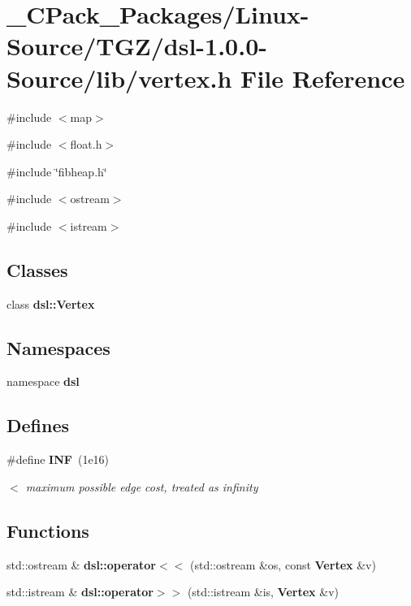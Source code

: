 \section{\_\-CPack\_\-Packages/Linux-\/Source/TGZ/dsl-\/1.0.0-\/Source/lib/vertex.h File Reference}
\label{__CPack__Packages_2Linux-Source_2TGZ_2dsl-1_80_80-Source_2lib_2vertex_8h}
{\ttfamily \#include $<$map$>$}\par
{\ttfamily \#include $<$float.h$>$}\par
{\ttfamily \#include \char`\"{}fibheap.h\char`\"{}}\par
{\ttfamily \#include $<$ostream$>$}\par
{\ttfamily \#include $<$istream$>$}\par
\subsection*{Classes}
\begin{DoxyCompactItemize}
\item 
class {\bf dsl::Vertex}
\end{DoxyCompactItemize}
\subsection*{Namespaces}
\begin{DoxyCompactItemize}
\item 
namespace {\bf dsl}
\end{DoxyCompactItemize}
\subsection*{Defines}
\begin{DoxyCompactItemize}
\item 
\#define {\bf INF}~(1e16)
\begin{DoxyCompactList}\small\item\em $<$ maximum possible edge cost, treated as infinity \item\end{DoxyCompactList}\end{DoxyCompactItemize}
\subsection*{Functions}
\begin{DoxyCompactItemize}
\item 
std::ostream \& {\bf dsl::operator$<$$<$} (std::ostream \&os, const {\bf Vertex} \&v)
\item 
std::istream \& {\bf dsl::operator$>$$>$} (std::istream \&is, {\bf Vertex} \&v)
\end{DoxyCompactItemize}


